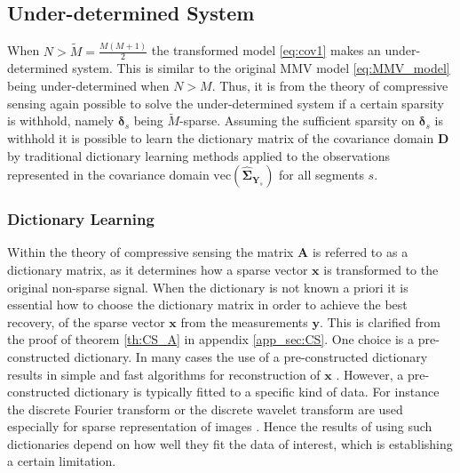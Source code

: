 \subsection{Under-determined System}\label{sec:cov1}
When $N > \widetilde{M} = \frac{M(M+1)}{2}$ the transformed model \eqref{eq:cov1} makes an under-determined system.   
This is similar to the original MMV model \eqref{eq:MMV_model} being under-determined  when $N > M$. 
Thus, it is from the theory of compressive sensing again possible to solve the under-determined system if a certain sparsity is withhold, namely $\boldsymbol{\delta}_s$ being $\widetilde{M}$-sparse.
Assuming the sufficient sparsity on $\boldsymbol{\delta}_s$ is withhold it is possible to learn the dictionary matrix of the covariance domain $\mathbf{D}$ by traditional dictionary learning methods applied to the observations represented in the covariance domain $\text{vec}(\widehat{\boldsymbol{\Sigma}}_{\mathbf{Y}_s})$ for all segments $s$.

\subsubsection{Dictionary Learning}\label{sec:dictionarylearning}
Within the theory of compressive sensing the matrix $\textbf{A}$ is referred to as a dictionary matrix, as it determines how a sparse vector $\textbf{x}$ is transformed to the original non-sparse signal. 
When the dictionary is not known a priori it is essential how to choose the dictionary matrix in order to achieve the best recovery, of the sparse vector $\mathbf{x}$ from the measurements $\mathbf{y}$. 
This is clarified from the proof of theorem \ref{th:CS_A} in appendix \ref{app_sec:CS}. 
One choice is a pre-constructed dictionary. 
In many cases the use of a pre-constructed dictionary results in simple and fast algorithms for reconstruction of $\mathbf{x}$ \cite{Elad_book}. 
However, a pre-constructed dictionary is typically fitted to a specific kind of data. 
For instance the discrete Fourier transform or the discrete wavelet transform are used especially for sparse representation of images \cite{Elad_book}. 
Hence the results of using such dictionaries depend on how well they fit the data of interest, which is establishing a certain limitation. 

